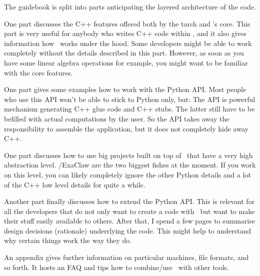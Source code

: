 The guidebook is split into parts anticipating the layered architecture of the
code.

One part discusses the C++ features offered both by the
tarch and \Peano's core.
This part is very useful for anybody who writes C++ code within \Peano, and it
also gives information how \Peano\ works under the hood. 
Some developers might be able to work completely without the details described
in this part.
However, as soon as you have some linear algebra operations for example, you
might want to be familiar with the core features.


One part gives some examples how to work with the Python API. 
Most people who use this API won't be able to stick to Python only, but:
The API is powerful mechanism generating C++ glue code and C++
stubs.
The latter still have to be befilled with actual computations by the user.
So the API takes away the responsibility to assemble the application, but it
does not completely hide away C++.


One part discusses how to use big projects built on top of
\Peano\ that have a very high abstraction level.
\ExaHyPE/ExaClaw are the two biggest fishes at the moment.
If you work on this level, you can likely completely ignore the other Python
details and a lot of the C++ low level details for quite a while.


Another part finally discusses how to extend the Python API.
This is relevant for all the developers that do not only want to create a code
with \Peano\ but want to make their stuff easily available to others.
After that, I spend a few pages to summarise design decisions (rationale)
underrlying the code.
This might help to understand why certain things work the way they do.


An appendix gives further information on particular machines, file formats, and
so forth. 
It hosts an FAQ and tips how to combine/use \Peano\ with other tools.
